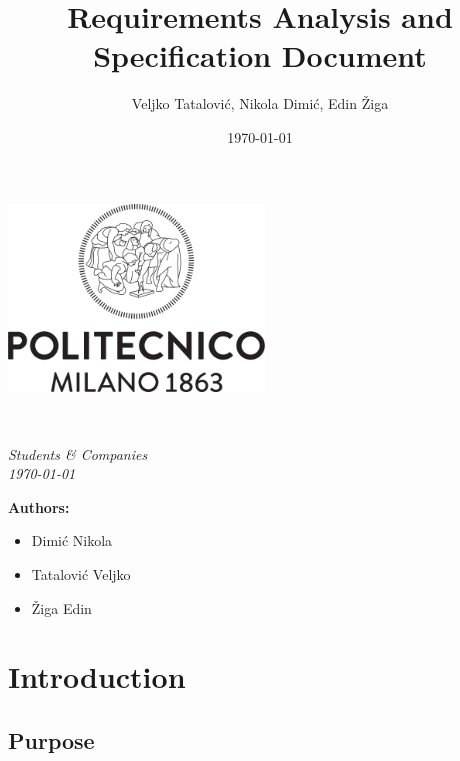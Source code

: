 \documentclass[a4paper,oneside,11pt]{article}
\title{Requirements Analysis and Specification Document}
\author{Veljko Tatalović, Nikola Dimić, Edin Žiga}
\date{\today}
\begin{document}
    \begin{titlingpage} 
        \begin{center}
            \includegraphics[height=5cm]{assets/Logo_Politecnico_Milano.png}\\
            \vspace{4cm}
            \begin{huge} 
                \textbf{\thetitle} \\
            \end{huge}
            \vspace{0.3cm}
            \begin{Large}
                \textit{Students \& Companies} \\
                \vspace{0.3cm}
                \textit{\today}
            \end{Large}
        \end{center}

            \vspace{4cm}
             \begin{large}
            \textbf{Authors:}
            \begin{itemize}
                \item Dimić Nikola
                \item Tatalović Veljko 
                \item Žiga Edin
            \end{itemize}
        \end{large}
    \end{titlingpage}
    \newpage
    \tableofcontents
    \newpage
    \section{Introduction}
    
        \subsection{Purpose}
            
\end{document}
